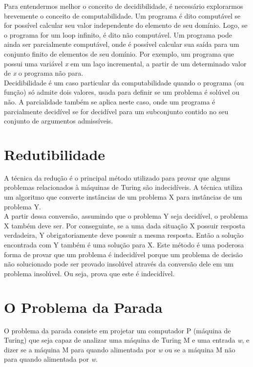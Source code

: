\documentclass[a4paper,10pt]{article}
\begin{document}
Para entendermos melhor o conceito de decidibilidade, \'e necess\'ario explorarmos brevemente o conceito de computabilidade. Um programa \'e dito comput\'avel se for poss\'ivel calcular seu valor independente do elemento de seu dom\'inio. Logo, se o programa for um loop infinito, \'e dito n\~ao comput\'avel. Um programa pode ainda ser parcialmente comput\'avel, onde \'e poss\'ivel calcular sua sa\'ida para um conjunto finito de elementos de seu dom\'inio. Por exemplo, um programa que possui uma vari\'avel \textit{x} em um la\c{c}o incremental, a partir de um determinado valor de \textit{x} o programa n\~ao para.\\
Decidibilidade \'e um caso particular da computabilidade quando o programa (ou fun\c{c}\~ao) só admite dois valores, usada para definir se um problema \'e solúvel ou n\~ao. A parcialidade tamb\'em se aplica neste caso, onde um programa \'e parcialmente decid\'ivel se for decid\'ivel para um subconjunto contido no seu conjunto de argumentos admiss\'iveis.

\section{Redutibilidade}

A técnica da redução é o principal método utilizado para provar que alguns problemas relacionados à máquinas de Turing são indecidíveis. A técnica utiliza um algoritmo que converte instâncias de um problema X para instâncias de um problema Y.\\
A partir dessa conversão, assumindo que o problema Y seja decidível, o problema X também deve ser. Por conseguinte, se a uma dada situação X possuir resposta verdadeira, Y obrigatoriamente deve possuir a mesma resposta. Então a solução encontrada com Y também é uma solução para X.
Este método é uma poderosa forma de provar que um problema é indecidível porque um problema de decisão não solucionado pode ser provado insolúvel através da conversão dele em um problema insolúvel. Ou seja, prova que este é indecidível.

\section{O Problema da Parada}

O problema da parada consiste em projetar um computador P (m\'aquina de Turing) que seja capaz de analizar uma m\'aquina de Turing M e uma entrada \textit{w}, e dizer se a m\'aquina M para quando alimentada por \textit{w} ou se a m\'aquina M n\~ao para quando alimentada por \textit{w}.
\end{document}
